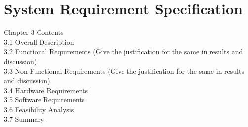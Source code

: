 \chapter{System Requirement Specification} %
\graphicspath{{Chapter3/figures/}}
{


Chapter 3 Contents\\


3.1 Overall Description \\
3.2 Functional Requirements (Give the justification for the same in results and discussion)\\
3.3 Non-Functional Requirements (Give the justification for the same in results and discussion)\\
3.4 Hardware Requirements \\
3.5 Software Requirements \\
3.6 Feasibility Analysis \\
3.7 Summary \\

}

